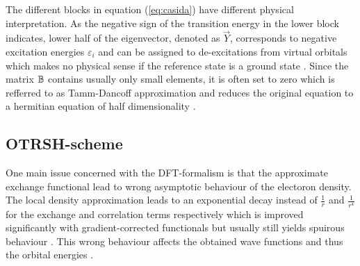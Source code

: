 The different blocks in equation (\ref{eq:casida}) have different physical interpretation.
As the negative sign of the transition energy in the lower block indicates, lower half of the eigenvector, denoted as $\vec{Y}$, corresponds to negative excitation energies $\varepsilon_i$ and can be assigned to de-excitations from virtual orbitals which makes no physical sense if the reference state is a ground state \cite{dreuw}.
Since the matrix $\mathbb{B}$ contains usually only small elements, it is often set to zero which is refferred to as Tamm-Dancoff approximation and reduces the original equation to a hermitian equation of half dimensionality \cite{casida}.

\subsection{OTRSH-scheme}
One main issue concerned with the DFT-formalism is that the approximate exchange functional lead to wrong asymptotic behaviour of the electoron density.
The local density approximation leads to an exponential decay instead of $\frac 1r$ and $\frac{1}{r^4}$ for the exchange and correlation terms respectively \cite{Bokareva} which is improved significantly with gradient-corrected functionals but usually still yields spuirous behaviour \cite{baerRSH}.
This wrong behaviour affects the obtained wave functions and thus the orbital energies \cite{OT-RSH}.

